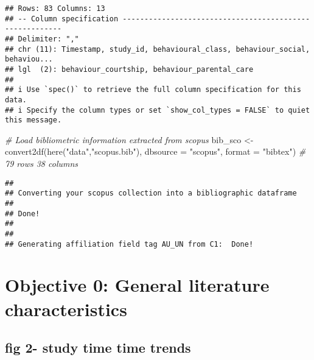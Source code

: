 \documentclass[
]{article}
\newenvironment{Shaded}{\begin{snugshade}}{\end{snugshade}}
\newcommand{\AttributeTok}[1]{\textcolor[rgb]{0.77,0.63,0.00}{#1}}
\newcommand{\CommentTok}[1]{\textcolor[rgb]{0.56,0.35,0.01}{\textit{#1}}}
\newcommand{\FunctionTok}[1]{\textcolor[rgb]{0.00,0.00,0.00}{#1}}
\newcommand{\NormalTok}[1]{#1}
\newcommand{\OtherTok}[1]{\textcolor[rgb]{0.56,0.35,0.01}{#1}}
\newcommand{\StringTok}[1]{\textcolor[rgb]{0.31,0.60,0.02}{#1}}
\begin{document}
\begin{verbatim}
## Rows: 83 Columns: 13
## -- Column specification --------------------------------------------------------
## Delimiter: ","
## chr (11): Timestamp, study_id, behavioural_class, behaviour_social, behaviou...
## lgl  (2): behaviour_courtship, behaviour_parental_care
## 
## i Use `spec()` to retrieve the full column specification for this data.
## i Specify the column types or set `show_col_types = FALSE` to quiet this message.
\end{verbatim}

\begin{Shaded}
\begin{Highlighting}[]
\CommentTok{\# Load bibliometric information extracted from scopus }
\NormalTok{bib\_sco }\OtherTok{\textless{}{-}} \FunctionTok{convert2df}\NormalTok{(}\FunctionTok{here}\NormalTok{(}\StringTok{"data"}\NormalTok{,}\StringTok{"scopus.bib"}\NormalTok{), }\AttributeTok{dbsource =} \StringTok{"scopus"}\NormalTok{, }\AttributeTok{format =} \StringTok{"bibtex"}\NormalTok{) }\CommentTok{\# 79 rows 38 columns }
\end{Highlighting}
\end{Shaded}

\begin{verbatim}
## 
## Converting your scopus collection into a bibliographic dataframe
## 
## Done!
## 
## 
## Generating affiliation field tag AU_UN from C1:  Done!
\end{verbatim}

\hypertarget{objective-0-general-literature-characteristics}{%
\section{Objective 0: General literature
characteristics}\label{objective-0-general-literature-characteristics}}

\hypertarget{fig-2--study-time-time-trends}{%
\subsection{fig 2- study time time
trends}\label{fig-2--study-time-time-trends}}
\end{document}
